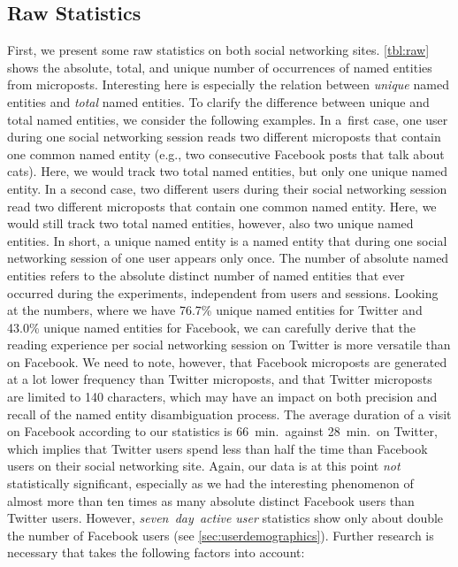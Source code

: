 \documentclass{iosart2c}
\begin{document}
\subsection{Raw Statistics}
First, we present some raw statistics on both social networking sites.
\autoref{tbl:raw} shows the absolute, total, and unique number of occurrences of named entities from microposts.
Interesting here is especially the relation between \emph{unique} named entities and \emph{total} named entities.
To clarify the difference between unique and total named entities, we consider the following examples.
In a~first case, one user during one social networking session reads two different microposts that contain one common named entity (e.g., two consecutive Facebook posts that talk about cats).
Here, we would track two total named entities, but only one unique named entity.
In a second case, two different users during their social networking session read two different microposts that contain one common named entity. Here, we would still track two total named entities, however, also two unique named entities.
In short, a unique named entity is a named entity that during one social networking session of one user appears only once.
The number of absolute named entities refers to the absolute distinct number of named entities that ever occurred during the experiments, independent from users and sessions.
Looking at the numbers, where we have 76.7\% unique named entities for Twitter and 43.0\% unique named entities for Facebook, we can carefully derive that the reading experience per social networking session on Twitter is more versatile than on Facebook.
We need to note, however, that Facebook microposts are generated at a lot lower frequency than Twitter microposts, and that Twitter microposts are limited to 140 characters, which may have an impact on both precision and recall of the named entity disambiguation process.
The average duration of a visit on Facebook according to our statistics is 66~min.\ against 28~min.\ on Twitter, which implies that Twitter users spend less than half the time than Facebook users on their social networking site.
Again, our data is at this point \emph{not} statistically significant, especially as we had the interesting phenomenon of almost more than ten times as many absolute distinct Facebook users than Twitter users.
However, \emph{seven~day~active user} statistics show only about double the number of Facebook users (see \autoref{sec:userdemographics}).
Further research is necessary that takes the following factors into account:
\end{document}
